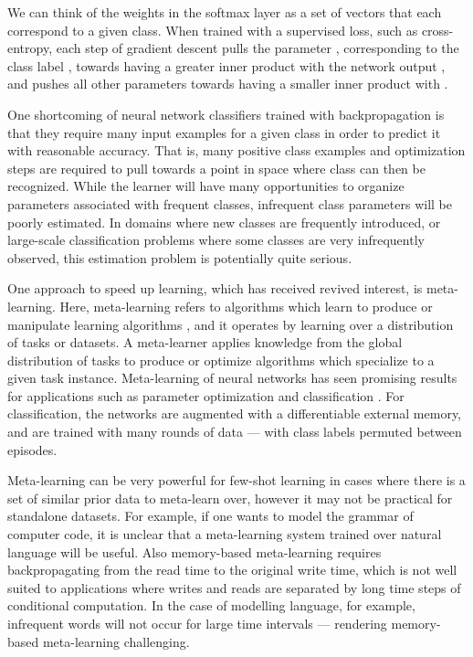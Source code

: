 \documentclass{article} \usepackage{hyperref}
\begin{document}
We can think of the weights in the softmax layer  as a set of  vectors  that each correspond to a given class. When trained with a supervised loss, such as cross-entropy, each step of gradient descent pulls the parameter , corresponding to the class label , towards having a greater inner product with the network output , and pushes all other parameters  towards having a smaller inner product with .

One shortcoming of neural network classifiers trained with backpropagation is that they require many input examples for a given class in order to predict it with reasonable accuracy. That is, many positive class examples and optimization steps are required to pull  towards a point in space where class  can then be recognized. While the learner will have many opportunities to organize  parameters associated with frequent classes, infrequent class parameters will be poorly estimated. In domains where new classes are frequently introduced, or large-scale classification problems where some classes are very infrequently observed, this estimation problem is potentially quite serious.

One approach to speed up learning, which has received revived interest, is meta-learning. Here, meta-learning refers to algorithms which learn to produce  or manipulate learning algorithms \citep{thrun1998lifelong, hochreiter2001learning}, and it operates by learning over a distribution of tasks or datasets. A meta-learner applies knowledge from the global distribution of tasks to produce or optimize algorithms which specialize to a given task instance. Meta-learning of neural networks has seen promising results for applications such as parameter optimization \citep{andrychowicz2016learning, finn2017model} and classification \citep{santoro2016one, vinyals2016matching, zhou2018deep}. For classification, the networks are augmented with a differentiable external memory, and are trained with many rounds of data --- with class labels permuted between episodes.

Meta-learning can be very powerful for few-shot learning in cases where there is a set of similar prior data to meta-learn over, however it may not be practical for standalone datasets. For example, if one wants to model the grammar of computer code, it is unclear that a meta-learning system trained over natural language will be useful. Also memory-based meta-learning requires backpropagating from the read time to the original write time, which is not well suited to applications where writes and reads are separated by long time steps of conditional computation. In the case of modelling language, for example, infrequent words will not occur for large time intervals --- rendering memory-based meta-learning challenging.
\end{document}
